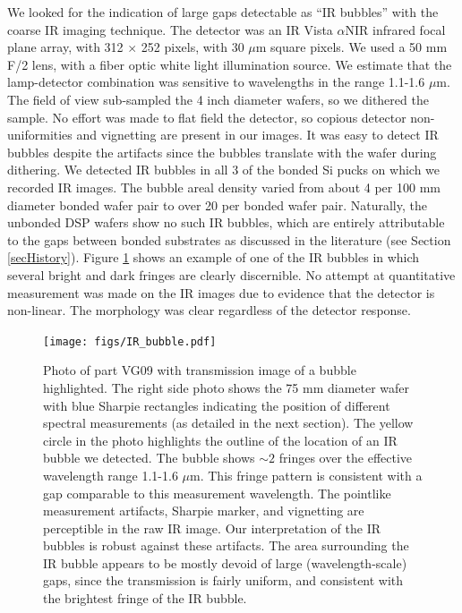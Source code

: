 \documentclass[osajnl,preprint,showpacs,superscriptaddress,12pt]{revtex4-1} %
\begin{document}
We looked for the indication of large gaps detectable as ``IR bubbles'' \cite{1992JEMat..21..669M} with the coarse IR imaging technique.  The detector was an IR Vista $\alpha$NIR infrared focal plane array, with 312 $\times$ 252 pixels, with 30 $\mu$m square pixels.  We used a 50 mm F/2 lens, with a fiber optic white light illumination source.  We estimate that the lamp-detector combination was sensitive to wavelengths in the range 1.1-1.6 $\mu$m.  The field of view sub-sampled the 4 inch diameter wafers, so we dithered the sample.  No effort was made to flat field the detector, so copious detector non-uniformities and vignetting are present in our images.  It was easy to detect IR bubbles despite the artifacts since the bubbles translate with the wafer during dithering.  We detected IR bubbles in all 3 of the bonded Si pucks on which we recorded IR images.  The bubble areal density varied from about 4 per 100 mm diameter bonded wafer pair to over 20 per bonded wafer pair.  Naturally, the unbonded DSP wafers show no such IR bubbles, which are entirely attributable to the gaps between bonded substrates as discussed in the literature (see Section \ref{secHistory}).  Figure \ref{IRbubble} shows an example of one of the IR bubbles in which several bright and dark fringes are clearly discernible.  No attempt at quantitative measurement was made on the IR images due to evidence that the detector is non-linear.  The morphology was clear regardless of the detector response.  


\begin{figure}[htbp]
\centerline{\texttt{[image: figs/IR\_bubble.pdf]}}
\caption{Photo of part VG09 with transmission image of a bubble highlighted\label{IRbubble}.  The right side photo shows the 75 mm diameter wafer with blue Sharpie rectangles indicating the position of different spectral measurements (as detailed in the next section).  The yellow circle in the photo highlights the outline of the location of an IR bubble we detected.  The bubble shows $\sim2$ fringes over the effective wavelength range 1.1-1.6 $\mu$m.  This fringe pattern is consistent with a gap comparable to this measurement wavelength.  The pointlike measurement artifacts, Sharpie marker, and vignetting are perceptible in the raw IR image.  Our interpretation of the IR bubbles is robust against these artifacts.  The area surrounding the IR bubble appears to be mostly devoid of large (wavelength-scale) gaps, since the transmission is fairly uniform, and consistent with the brightest fringe of the IR bubble.  }
\end{figure}
\end{document}
